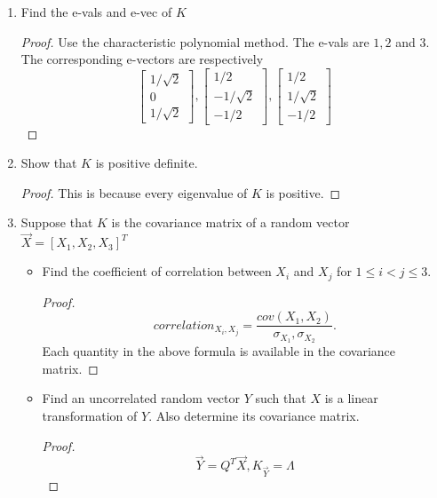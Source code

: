 \documentclass[../main.tex]{subfiles}
\begin{document}
\begin{enumerate}
    \item Find the e-vals and e-vec of $K$
    \begin{proof}
        Use the characteristic polynomial method. The e-vals are $1,2$ and $3$. The corresponding e-vectors are respectively \[
        \begin{bmatrix}
            1/\sqrt{2}\\
            0\\
            1/\sqrt{2}
        \end{bmatrix}, \begin{bmatrix}
            1/2\\
            -1/\sqrt{2}\\
            -1/2
        \end{bmatrix}, \begin{bmatrix}
            1/2\\ 1/\sqrt{2} \\ -1/2
        \end{bmatrix}
        \]
    \end{proof}
    \item Show that $K$ is positive definite. 
    \begin{proof}
        This is because every eigenvalue of $K$ is positive.
    \end{proof}
    \item Suppose that $K$ is the covariance matrix of a random vector $\vec X=[X_1,X_2,X_3]^T$
    \begin{itemize}
        \item Find the coefficient of correlation between $X_i$ and $X_j$ for $1\leq i < j \leq 3$.
        \begin{proof}
            \[
            correlation_{X_i,X_j} = \frac{cov(X_1,X_2)}{\sigma_{X_1},\sigma_{X_2}}.
            \] Each quantity in the above formula is available in the covariance matrix.
        \end{proof}
        \item Find an uncorrelated random vector $Y$ such that $X$ is a linear transformation of $Y$. Also determine its covariance matrix.
        \begin{proof}
            \[
            \vec Y = Q^T\vec X, K_{\vec Y}=\Lambda
            \]
        \end{proof}
    \end{itemize}
\end{enumerate}
\end{document}
